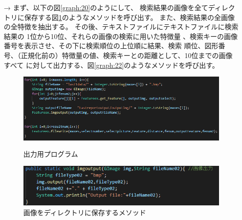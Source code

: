 \begin{enumerate}
  \begin{itemize}
    \item[→] まず、以下の図\ref{graph:20}のようにして、
    検索結果の画像を全てディレクトリに保存する図\ref{graph:21}のようなメソッドを呼び出す。
    また、検索結果の全画像の全特徴を抽出する。
    その後、テキストファイルにテキストファイルに検索結果の
    1位から10位、それらの画像の検索に用いた特徴量
    、検索キーの画像番号を表示させ、その下に検索順位の上位順に結果、検索
    順位、図形番号、（正規化前の）特徴量の値、検索キーとの距離として、10位までの画像すべて
    に対して出力する、図\ref{graph:22}のようなメソッドを呼び出す。
    \begin{figure}[htbp]
      \begin{minipage}[t]{0.45\hsize}
        \includegraphics[scale=0.4]{ファイルに出力.PNG}
        \centering
        \caption{出力用プログラム}
        \label{graph:20}
      \end{minipage}
      \begin{minipage}[t]{0.45\hsize}
        \includegraphics[scale=0.5]{画像保存.PNG}
        \centering
        \caption{画像をディレクトリに保存するメソッド}
        \label{graph:21}
      \end{minipage}
      \begin{minipage}[t]{\hsize}

\end{minipage}
\end{figure}
\end{itemize}
\end{enumerate}
